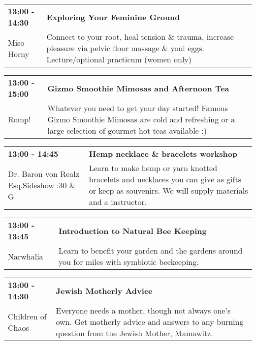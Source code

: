\begin{tabular}{ p{1in} p{2.2in} }
    \textbf{13:00 - 14:30} & \textbf{Exploring Your Feminine Ground} \\
    Miso Horny \newline  & Connect to your root, heal tension \& trauma, increase pleasure via pelvic floor massage \& yoni eggs. Lecture/optional practicum (women only) \\
    \hline 
\end{tabular}
    
\begin{tabular}{ p{1in} p{2.2in} }
    \textbf{13:00 - 15:00} & \textbf{Gizmo Smoothie Mimosas and Afternoon Tea} \\
    Romp! \newline  & Whatever you need to get your day started! Famous Gizmo Smoothie Mimosas are cold and refreshing or a large selection of gourmet hot teas available :) \\
    \hline 
\end{tabular}
    
\begin{tabular}{ p{1in} p{2.2in} }
    \textbf{13:00 - 14:45} & \textbf{Hemp necklace \& bracelets workshop} \\
    Dr. Baron von Realz Esq.Sideshow \newline 4:30 \& G & Learn to make hemp or yarn knotted bracelets and necklaces you can give as gifts or keep as souvenirs. We will supply materials and a instructor. \\
    \hline 
\end{tabular}
    
\begin{tabular}{ p{1in} p{2.2in} }
    \textbf{13:00 - 13:45} & \textbf{Introduction to Natural Bee Keeping} \\
    Narwhalia \newline  & Learn to benefit your garden and the gardens around you for miles with symbiotic beekeeping. \\
    \hline 
\end{tabular}
    
\begin{tabular}{ p{1in} p{2.2in} }
    \textbf{13:00 - 14:30} & \textbf{Jewish Motherly Advice} \\
    Children of Chaos \newline  & Everyone needs a mother, though not always one's own.  Get motherly advice and answers to any burning question from the Jewish Mother, Mamawitz. \\
    \hline 
\end{tabular}
    
